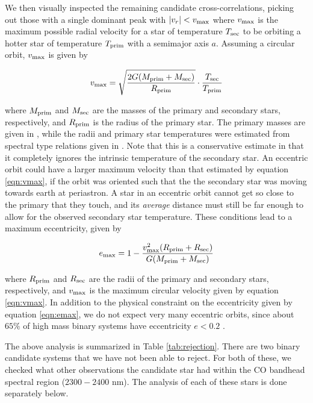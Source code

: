 \documentclass[11pt]{report}     %
\begin{document}
We then visually inspected the remaining candidate cross-correlations,
picking out those with a single dominant peak with $|v_r| < v_{\rm max}$
where $v_{\rm max}$ is the maximum possible radial velocity for a star of
temperature $T_{\rm sec}$ to be orbiting a hotter star of temperature
$T_{\rm prim}$ with a semimajor axis $a$. Assuming a circular orbit,
$v_{\rm max}$ is given by

\begin{equation}
v_{\rm max} = \sqrt{\frac{2G(M_{\rm prim} + M_{\rm sec})}{R_{\rm prim}}} \cdot \frac{T_{\rm sec}}{T_{\rm prim}}
\label{eqn:vmax}
\end{equation}

where $M_{\rm prim}$ and $M_{\rm sec}$ are the masses of the primary and
secondary stars, respectively, and $R_{\rm prim}$ is the radius of the
primary star. The primary masses are given in \cite{Tetzlaff2010}, while
the radii and primary star temperatures were estimated from spectral type relations given in
\cite{CarrollOstlie}. Note that this is a conservative estimate in
that it completely ignores the intrinsic temperature of the secondary
star. An eccentric orbit could have a larger maximum velocity than
that estimated by equation \ref{eqn:vmax}, if the orbit was oriented
such that the the secondary star was moving towards earth at
periastron. A star in an eccentric orbit cannot get so close to the
primary that they touch, and its \emph{average} distance must still be
far enough to allow for the observed secondary star temperature. These
conditions lead to a maximum eccentricity, given by

\begin{equation}
e_{\rm max} = 1 - \frac{v_{\rm max}^2 (R_{\rm prim} + R_{\rm sec})}{G(M_{\rm prim} + M_{\rm sec})}
\label{eqn:emax}
\end{equation}

where $R_{\rm prim} $ and $R_{\rm sec}$ are the radii of the primary
and secondary stars, respectively, and $v_{\rm max}$ is the maximum
circular velocity given by equation \ref{eqn:vmax}. In addition to the
physical constraint on the eccentricity given by equation
\ref{eqn:emax}, we do not expect very many eccentric orbits, since
about $65\%$ of high mass binary systems have eccentricity $e < 0.2$ \citep{Sana2011}.

The above analysis is summarized in Table \ref{tab:rejection}. There
are two binary candidate systems that we have not been able to reject.
 For both of these, we checked what other observations the candidate
star had within the CO bandhead spectral region ($2300-2400$ nm). The analysis of each
of these stars is done separately below.
\end{document}

